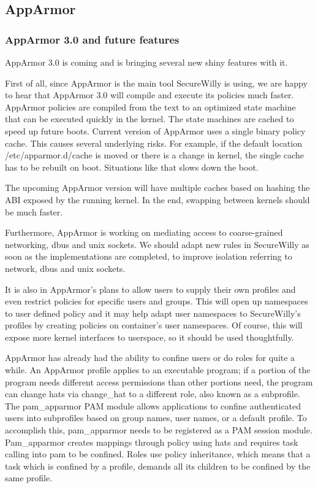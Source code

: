 \subsection{AppArmor}
\subsubsection{AppArmor 3.0 and future features}
AppArmor 3.0 is coming and is bringing several new shiny features with it. \cite{app3seth}

First of all, since AppArmor is the main tool SecureWilly is using, we are happy to hear that AppArmor 3.0 will compile and execute its policies much faster. AppArmor policies are compiled from the text to an optimized state machine that can be executed quickly in the kernel. The state machines are cached to speed up future boots. Current version of AppArmor uses a single binary policy cache. This causes several underlying risks. For example, if the default location /etc/apparmor.d/cache is moved or there is a change in kernel, the single cache has to be rebuilt on boot. Situations like that slows down the boot.
  
The upcoming AppArmor version will have multiple caches based on hashing the ABI exposed by the running kernel. In the end, swapping between kernels should be much faster.

Furthermore, AppArmor is working on mediating access to coarse-grained networking, dbus and unix sockets. We should adapt new rules in SecureWilly as soon as the implementations are completed, to improve isolation referring to network, dbus and unix sockets. 

It is also in AppArmor's plans to allow users to supply their own profiles and even restrict policies for specific users and groups. This will open up namespaces to user defined policy and it may help adapt user namespaces to SecureWilly's profiles by creating policies on container's user namespaces. Of course, this will expose more kernel interfaces to userspace, so it should be used thoughtfully.

AppArmor has already had the ability to confine users or do roles for quite a while. 
An AppArmor profile applies to an executable program; if a portion of the program needs different access permissions than other portions need, the program can change hats via change\_hat to a different role, also known as a subprofile. The pam\_apparmor PAM module allows applications to confine authenticated users into subprofiles based on group names, user names, or a default profile. To accomplish this, pam\_apparmor needs to be registered as a PAM session module. \cite{susepam}
Pam\_apparmor creates mappings through policy using hats and requires task calling into pam to be confined. Roles use policy inheritance, which means that a task which is confined by a profile, demands all its children to be confined by the same profile.

